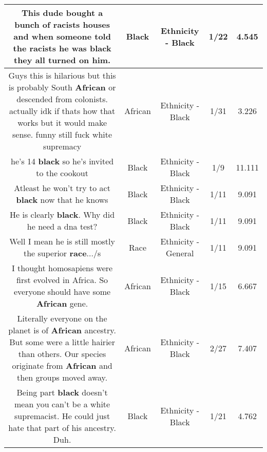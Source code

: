 \documentclass[11pt]{article}
\newlength\mylength
\begin{document}
\begin{center}
\begin{longtable}{|C{.65\mylength}|C{.30\mylength}|C{.12\mylength}|C{.12\mylength}|C{.12\mylength}|}
  \small This dude bought a bunch of racists houses and when someone told the racists he was \textbf{black} they all turned on him.\normalsize   & Black & Ethnicity - Black & 1/22 & 4.545 \\  \hline
  \small Guys this is hilarious but this is probably South \textbf{African} or descended from colonists. actually idk if thats how that works but it would make sense. funny still fuck white supremacy\normalsize   & African & Ethnicity - Black & 1/31 & 3.226 \\  \hline
  \small he's 14 \textbf{black} so he's invited to the cookout\normalsize   & Black & Ethnicity - Black & 1/9 & 11.111 \\  \hline
  \small Atleast he won't try to act \textbf{black} now that he knows\normalsize   & Black & Ethnicity - Black & 1/11 & 9.091 \\  \hline
  \small He is clearly \textbf{black}. Why did he need a dna test?\normalsize   & Black & Ethnicity - Black & 1/11 & 9.091 \\  \hline
  \small Well I mean he is still mostly the superior \textbf{race}.../s\normalsize   & Race & Ethnicity - General & 1/11 & 9.091 \\  \hline
  \small I thought homosapiens were first evolved in Africa. So everyone should have some \textbf{African} gene.\normalsize   & African & Ethnicity - Black & 1/15 & 6.667 \\  \hline
  \small Literally everyone on the planet is of \textbf{African} ancestry. But some were a little hairier than others. Our species originate from \textbf{African} and then groups moved away.\normalsize   & African & Ethnicity - Black & 2/27 & 7.407 \\  \hline
  \small Being part \textbf{black} doesn't mean you can't be a white supremacist. He could just hate that part of his ancestry. Duh.\normalsize   & Black & Ethnicity - Black & 1/21 & 4.762 \\  \hline

\end{longtable}
\end{center}
\end{document}
